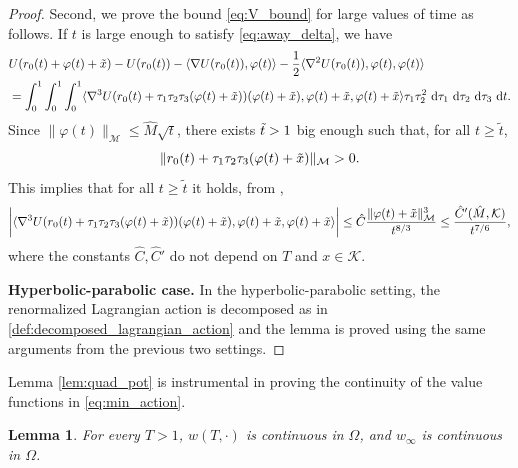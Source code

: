\documentclass[a4paper,10pt]{amsart}
\newcommand{\ud}{\mathrm{d}}
\theoremstyle{plain}
\newtheorem{lem}[thm]{Lemma}
\theoremstyle{definition}
\numberwithin{equation}{section}
\numberwithin{thm}{section}
\begin{document}
\begin{proof}
    \smallskip
    Second, we prove the bound \eqref{eq:V_bound} for large values of time as follows. If $t$ is large enough to satisfy \eqref{eq:away_delta}, we have
\[
    \begin{split}
    & U(r_0(t)+\varphi(t)+\Tilde{x}) - U(r_0(t)) - \langle \nabla U(r_0(t)),\varphi(t)\rangle - \frac{1}{2}\langle \nabla^2 U(r_0(t)),\varphi(t),\varphi(t)\rangle \\
    & = \int_{0}^{1}\int_{0}^{1}\int_{0}^{1} \langle \nabla^3 U(r_0(t) + \tau_1\tau_2\tau_3 (\varphi(t)+\Tilde{x}))(\varphi(t)+\Tilde{x}),\varphi(t)+\Tilde{x},\varphi(t)+\Tilde{x}\rangle \tau_1 \tau_2^2\ \ud \tau_1\ \ud \tau_2\ \ud \tau_3\ \ud t.
     \end{split}
\]
Since $\|\varphi(t)\|_\mathcal{M}\le \hat M\sqrt{t}$,  there exists $\Tilde{t}>1$ big enough such that, for all $t\geq \tilde t$,
\begin{displaymath}
    \|r_0(t) + \tau_1\tau_2\tau_3 (\varphi(t)+\Tilde{x})\|_\mathcal{M}>0.
\end{displaymath}
This implies that for all $t\geq \tilde t$ it holds, from \cite[pag. 25]{PolimeniTerracini}, 
\[
    \bigg|\langle \nabla^3 U(r_0(t) + \tau_1\tau_2\tau_3 (\varphi(t)+\Tilde{x}))(\varphi(t)+\Tilde{x}),\varphi(t)+\Tilde{x},\varphi(t)+\Tilde{x}\rangle \bigg| \leq \hat{C}\frac{\|\varphi(t) + \Tilde{x}\|_\mathcal{M}^3}{t^{8/3}} \leq \frac{\hat{C}'(\hat M, \mathcal{K})}{t^{7/6}},
\]
where the constants $\hat C, \hat C'$ do not depend on $T$ and $x\in \mathcal{K}$. 

\smallskip
\textbf{Hyperbolic-parabolic case.}
In the hyperbolic-parabolic setting, the renormalized Lagrangian action is decomposed as in \eqref{def:decomposed_lagrangian_action} and the lemma is proved using the same arguments from the previous two settings.
\end{proof}

Lemma \ref{lem:quad_pot} is instrumental in proving the continuity of the value functions in \eqref{eq:min_action}.



\begin{lem}\label{lem:continuity_w}
For every $T>1$, $w(T,\cdot)$ is continuous in $\Omega$, and $w_\infty$ is continuous in $\Omega$. 
\end{lem}
\end{document}
